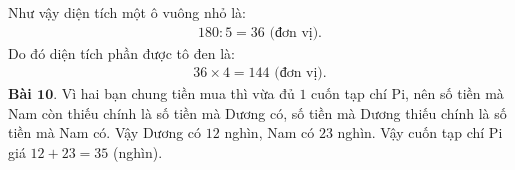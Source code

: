 \begin{multicols}{2}
\begin{figure}[H]
		\vspace*{-15pt}
	\end{figure}
	Như vậy diện tích một ô vuông nhỏ là: 
	\begin{align*}
		180:5 = 36 \text{ (đơn vị).}
	\end{align*}
	Do đó diện tích phần được tô đen là: 
	\begin{align*}
		36\times 4 = 144 \text{ (đơn vị).}
	\end{align*}
	\textbf{\color{toancuabi}Bài $\pmb{10.}$} Vì hai bạn chung tiền mua thì vừa đủ $1$ cuốn tạp chí Pi, nên số tiền mà Nam còn thiếu chính là số tiền mà Dương có, số tiền mà Dương thiếu chính là số tiền mà Nam có. Vậy Dương có $12$ nghìn, Nam có $23$ nghìn. Vậy cuốn tạp chí Pi giá $12+23=35$ (nghìn).
\end{multicols}
